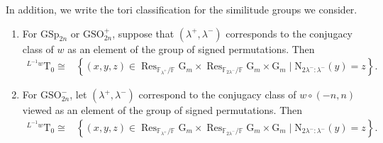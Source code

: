 \documentclass[12pt, reqno]{amsart}
\theoremstyle{definition}
\theoremstyle{definition}
\theoremstyle{definition}
\newcommand{\GSO}{\mathrm{GSO}}
\newcommand{\GSp}{\mathrm{GSp}}
\newcommand{\FieldNorm}[2]{\mathrm{N}_{#1:#2}}
\newcommand{\finiteField}{\mathbb{F}}
\newcommand{\finiteFieldExtension}[1]{\finiteField_{#1}}
\newcommand{\restrictionOfScalars}[3]{\operatorname{Res}_{#1 \slash #2}{#3}}
\newcommand{\multiplcativeScheme}{\algebraicGroup{G}_m}
\newcommand{\algebraicGroup}[1]{\boldsymbol{\mathrm{#1}}}
\begin{document}
    
    In addition, we write the tori classification for the similitude groups we consider.
	\begin{enumerate}
		\item For $\algebraicGroup{\GSp}_{2n}$ or $\algebraicGroup{\GSO}_{2n}^+$, suppose that $(\lambda^+,\lambda^-)$ corresponds to the conjugacy class of $w$ as an element of the group of signed permutations. Then
			\begin{align*}
				^{L^{-1}w}\algebraicGroup{T}_0 \cong& \left\{\left(x,y,z\right) \in  \restrictionOfScalars{\finiteFieldExtension{\lambda^+}}{\finiteField}{\multiplcativeScheme} \times \restrictionOfScalars{\finiteFieldExtension{2\lambda^-}}{\finiteField}{\multiplcativeScheme}  \times \multiplcativeScheme \mid \FieldNorm{2\lambda^-}{\lambda^-}(y) = z \right\}.
			\end{align*}
			\item For $\algebraicGroup{\GSO}_{2n}^-$, let $(\lambda^+,\lambda^-)$ correspond to the conjugacy class of $w\circ (-n,n)$ viewed as an element of the group of signed permutations. Then
			\begin{align*}
				^{L^{-1}w}\algebraicGroup{T}_0 \cong& \left\{\left(x,y,z\right) \in  \restrictionOfScalars{\finiteFieldExtension{\lambda^+}}{\finiteField}{\multiplcativeScheme} \times \restrictionOfScalars{\finiteFieldExtension{2\lambda^-}}{\finiteField}{\multiplcativeScheme}  \times \multiplcativeScheme \mid \FieldNorm{2\lambda^-}{\lambda^-}(y) = z \right\}.
			\end{align*}
	\end{enumerate}
\end{document}
